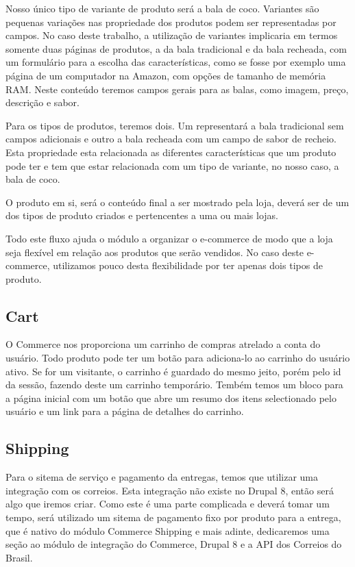 Nosso único tipo de variante de produto será a bala de coco. Variantes são pequenas variações nas propriedade dos produtos podem ser representadas por campos. No caso deste trabalho, a utilização de variantes implicaria em termos somente duas páginas de produtos, a da bala tradicional e da bala recheada, com um formulário para a escolha das características, como se fosse por exemplo uma página de um computador na Amazon, com opções de tamanho de memória RAM. Neste conteúdo teremos campos gerais para as balas, como imagem, preço, descrição e sabor.

Para os tipos de produtos, teremos dois. Um representará a bala tradicional sem campos adicionais e outro a bala recheada com um campo de sabor de recheio. Esta propriedade esta relacionada as diferentes características que um produto pode ter e tem que estar relacionada com um tipo de variante, no nosso caso, a bala de coco.

O produto em si, será o conteúdo final a ser mostrado pela loja, deverá ser de um dos tipos de produto criados e pertencentes a uma ou mais lojas.

Todo este fluxo ajuda o módulo a organizar o e-commerce de modo que a loja seja flexível em relação aos produtos que serão vendidos. No caso deste e-commerce, utilizamos pouco desta flexibilidade por ter apenas dois tipos de produto.

\subsection{Cart}
O Commerce nos proporciona um carrinho de compras atrelado a conta do usuário. Todo produto pode ter um botão para adiciona-lo ao carrinho do usuário ativo. Se for um visitante, o carrinho é guardado do mesmo jeito, porém pelo id da sessão, fazendo deste um carrinho temporário. Tembém temos um bloco para a página inicial com um botão que abre um resumo dos itens selectionado pelo usuário e um link para a página de detalhes do carrinho.

\subsection{Shipping}
Para o sitema de serviço e pagamento da entregas, temos que utilizar uma integração com os correios. Esta integração não existe no Drupal 8, então será algo que iremos criar. Como este é uma parte complicada e deverá tomar um tempo, será utilizado um sitema de pagamento fixo por produto para a entrega, que é nativo do módulo Commerce Shipping e mais adinte, dedicaremos uma seção ao módulo de integração do Commerce, Drupal 8 e a API dos Correios do Brasil.

